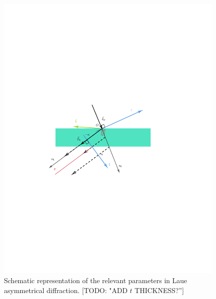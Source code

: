 \documentclass[preprint]{iucr}              %
\newcommand{\todo}[1]{{\color{red}[TODO: "#1'']}}
\begin{document}
\begin{figure}
\label{fig:laue}
\caption{Schematic representation of the relevant parameters in Laue asymmetrical diffraction. \todo{ADD $t$ THICKNESS?}
}
\includegraphics[width=0.99\textwidth,trim=3cm 10cm 5cm 10cm,clip=true]{fig3.pdf}
\end{figure}
\end{document}
